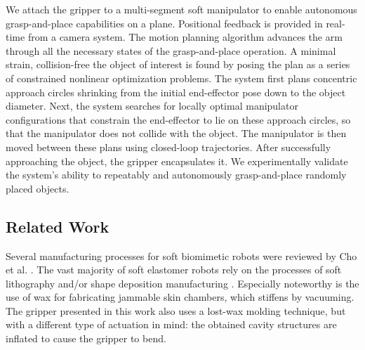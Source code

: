 We attach the gripper to a multi-segment soft manipulator to enable autonomous grasp-and-place capabilities on a plane. 
Positional feedback is provided in real-time from a camera system.
The motion planning algorithm advances the arm through all the necessary states of the grasp-and-place operation.
A minimal strain, collision-free  the object of interest is found by posing the plan as a series of constrained nonlinear optimization problems.
The system first plans concentric approach circles shrinking from the initial end-effector pose down to the object diameter.
Next, the system searches for locally optimal manipulator configurations that constrain the end-effector to lie on these approach circles, so that the manipulator does not collide with the object. 
The manipulator is then moved between these plans using closed-loop trajectories. 
After successfully approaching the object, the gripper encapsulates it.
We experimentally validate the system's ability to repeatably and autonomously grasp-and-place randomly placed objects.

\subsection{Related Work}

Several manufacturing processes for soft biomimetic robots were reviewed by Cho et al. \cite{cho2009review}. 
The vast majority of soft elastomer robots rely on the processes of soft lithography \cite{xia1998soft} and/or shape deposition manufacturing \cite{cham2002fast}. 
Especially noteworthy is the use of wax for fabricating jammable skin chambers, which stiffens by vacuuming\cite{steltz2009soft}. 
The gripper presented in this work also uses a lost-wax molding technique, but with a different type of actuation in mind: the obtained cavity structures are inflated to cause the gripper to bend.

